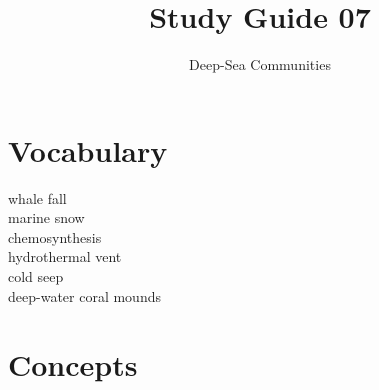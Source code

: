 \documentclass[nofonts, letterpaper]{tufte-handout}
\title{Study Guide 07}
\author{Deep-Sea Communities}
\date{} %
\begin{document}
\maketitle	%


\section{Vocabulary}
\vspace{-1\baselineskip}
\begin{multicols}{2}
whale fall \\
marine snow \\
chemosynthesis \\
hydrothermal vent \\
cold seep \\
deep-water coral mounds
\end{multicols}

\section{Concepts}
\end{document}
